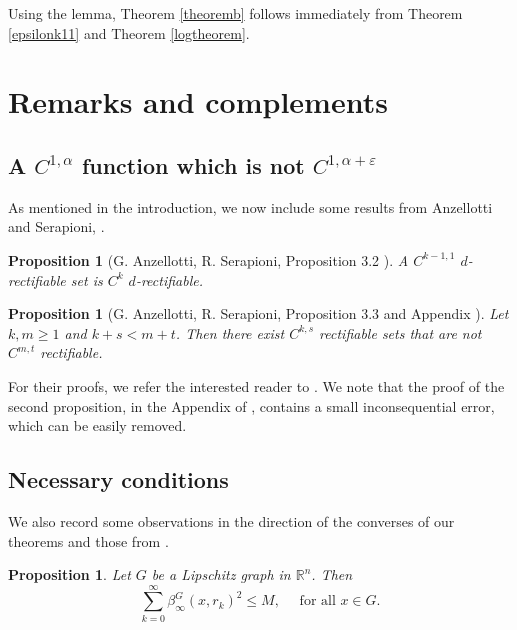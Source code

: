 \documentclass[11pt, twoside, leqno]{article}
\numberwithin{equation}{section}
\theoremstyle{plain}
\newtheorem{prop}[thm]{Proposition}
\theoremstyle{definition}
\newcommand{\R}{\mathbb{R}}
\newcommand{\e}{\varepsilon} %
\begin{document}
Using the lemma, Theorem \ref{theoremb} follows immediately from Theorem \ref{epsilonk11} and Theorem \ref{logtheorem}.


\section{Remarks and complements} \label{stuff}


\subsection{A $C^{1,\alpha}$ function which is not $C^{1,\alpha + \e}$}

As mentioned in the introduction, we now include some results from Anzellotti and Serapioni, \cite{anzellottiserapioni}. 
\begin{prop} [G. Anzellotti, R. Serapioni,  Proposition 3.2  \cite{anzellottiserapioni}] \label{c1=c2}
A $C^{k-1,1}$ $d$-rectifiable set is $C^k$ $d$-rectifiable.
\end{prop}


\begin{prop} [G. Anzellotti, R. Serapioni,  Proposition 3.3 and Appendix  \cite{anzellottiserapioni}]\label{c1snoc1t}
Let $k,m \geq 1$ and $k + s <m+t$. Then there exist $C^{k,s}$ rectifiable sets that are not $C^{m,t}$ rectifiable.
\end{prop}

For their proofs, we refer the interested reader to \cite{anzellottiserapioni}. We note that the proof of the second proposition, in the Appendix of \cite{anzellottiserapioni}, contains a small inconsequential error, which can be easily removed.



\subsection{Necessary conditions} \label{necessary}

We also record some observations in the direction of the converses of our theorems and those from \cite{davidtoro}.

\begin{prop}
Let $G$ be a Lipschitz graph in $\R^n$. Then 
\begin{equation}
    \sum_{k=0}^{\infty}\beta_{\infty}^G(x,r_k)^2 \leq M, \quad \text{ for all $x \in G$}.
\end{equation}
\end{prop}
\end{document}
